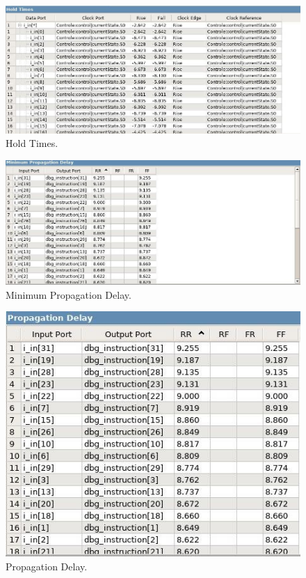\documentclass{article}
\begin{document}
        \begin{figure}[H]
            \centering
            \includegraphics[width=\textwidth]{hold_times.jpg}
            \caption{Hold Times.}
            \label{figura:mips}
        \end{figure}

        \begin{figure}[H]
            \centering
            \includegraphics[width=\textwidth]{minimum_propagation_delay.jpg}
            \caption{Minimum Propagation Delay.}
            \label{figura:mips}
        \end{figure}

        \begin{figure}[H]
            \centering
            \includegraphics[width=\textwidth]{propagation_delay.jpg}
            \caption{Propagation Delay.}
            \label{figura:mips}
        \end{figure}
\end{document}
